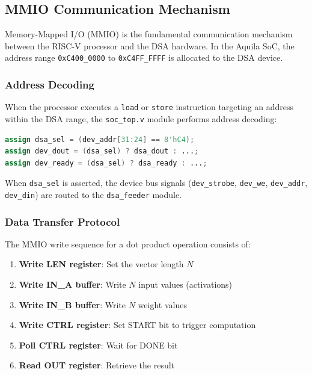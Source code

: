 \documentclass[conference]{IEEEtran}
\begin{document}
\subsection{MMIO Communication Mechanism}

Memory-Mapped I/O (MMIO) is the fundamental communication mechanism between the RISC-V processor and the DSA hardware. In the Aquila SoC, the address range \texttt{0xC400\_0000} to \texttt{0xC4FF\_FFFF} is allocated to the DSA device.

\subsubsection{Address Decoding}
When the processor executes a \texttt{load} or \texttt{store} instruction targeting an address within the DSA range, the \texttt{soc\_top.v} module performs address decoding:

\begin{lstlisting}[language=Verilog,caption=Address Decoding in soc\_top.v]
assign dsa_sel = (dev_addr[31:24] == 8'hC4);
assign dev_dout = (dsa_sel) ? dsa_dout : ...;
assign dev_ready = (dsa_sel) ? dsa_ready : ...;
\end{lstlisting}

When \texttt{dsa\_sel} is asserted, the device bus signals (\texttt{dev\_strobe}, \texttt{dev\_we}, \texttt{dev\_addr}, \texttt{dev\_din}) are routed to the \texttt{dsa\_feeder} module.

\subsubsection{Data Transfer Protocol}
The MMIO write sequence for a dot product operation consists of:

\begin{enumerate}
    \item \textbf{Write LEN register}: Set the vector length $N$
    \item \textbf{Write IN\_A buffer}: Write $N$ input values (activations)
    \item \textbf{Write IN\_B buffer}: Write $N$ weight values
    \item \textbf{Write CTRL register}: Set START bit to trigger computation
    \item \textbf{Poll CTRL register}: Wait for DONE bit
    \item \textbf{Read OUT register}: Retrieve the result
\end{enumerate}
\end{document}
